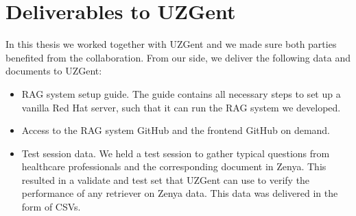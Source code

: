 \chapter{Deliverables to UZGent}

In this thesis we worked together with UZGent and we made sure both parties benefited from the collaboration. From our side, we deliver the following data and documents to UZGent:

\begin{itemize}
    \item RAG system setup guide. The guide contains all necessary steps to set up a vanilla Red Hat server, such that it can run the RAG system we developed.
    \item Access to the RAG system GitHub and the frontend GitHub on demand.
    \item Test session data. We held a test session to gather typical questions from healthcare professionals and the corresponding document in Zenya. This resulted in a validate and test set that UZGent can use to verify the performance of any retriever on Zenya data. This data was delivered in the form of CSVs.
\end{itemize}
